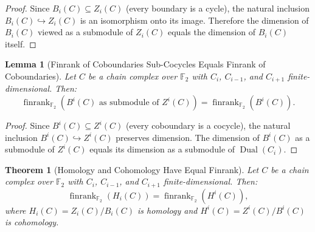 \documentclass[11pt]{article}
\theoremstyle{plain}
\newtheorem*{theorem}{Theorem}
\newtheorem*{lemma}{Lemma}
\theoremstyle{definition}
\theoremstyle{remark}
\begin{document}
\begin{proof}
Since $B_i(C) \subseteq Z_i(C)$ (every boundary is a cycle), the natural inclusion $B_i(C) \hookrightarrow Z_i(C)$ is an isomorphism onto its image. Therefore the dimension of $B_i(C)$ viewed as a submodule of $Z_i(C)$ equals the dimension of $B_i(C)$ itself.
\end{proof}

\begin{lemma}[Finrank of Coboundaries Sub-Cocycles Equals Finrank of Coboundaries]
Let $C$ be a chain complex over $\mathbb{F}_2$ with $C_i$, $C_{i-1}$, and $C_{i+1}$ finite-dimensional. Then:
\[
  \operatorname{finrank}_{\mathbb{F}_2}(B^i(C) \text{ as submodule of } Z^i(C)) = \operatorname{finrank}_{\mathbb{F}_2}(B^i(C)).
\]
\end{lemma}

\begin{proof}
Since $B^i(C) \subseteq Z^i(C)$ (every coboundary is a cocycle), the natural inclusion $B^i(C) \hookrightarrow Z^i(C)$ preserves dimension. The dimension of $B^i(C)$ as a submodule of $Z^i(C)$ equals its dimension as a submodule of $\operatorname{Dual}(C_i)$.
\end{proof}

\begin{theorem}[Homology and Cohomology Have Equal Finrank]
Let $C$ be a chain complex over $\mathbb{F}_2$ with $C_i$, $C_{i-1}$, and $C_{i+1}$ finite-dimensional. Then:
\[
  \operatorname{finrank}_{\mathbb{F}_2}(H_i(C)) = \operatorname{finrank}_{\mathbb{F}_2}(H^i(C)),
\]
where $H_i(C) = Z_i(C)/B_i(C)$ is homology and $H^i(C) = Z^i(C)/B^i(C)$ is cohomology.
\end{theorem}
\end{document}
